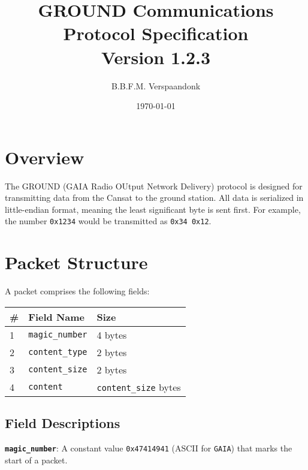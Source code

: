 \documentclass[a4paper]{article}
\title{GROUND Communications Protocol Specification\\ \large Version 1.2.3}
\date{\today}
\author{B.B.F.M. Verspaandonk}
\begin{document}
\maketitle

\tableofcontents

\section{Overview}
The GROUND (GAIA Radio OUtput Network Delivery) protocol is designed for transmitting data from the Cansat to the ground station. All data is serialized in little-endian format, meaning the least significant byte is sent first. For example, the number \texttt{0x1234} would be transmitted as \texttt{0x34 0x12}.

\section{Packet Structure}
A packet comprises the following fields:
\begin{longtable}{@{}lll@{}}
\toprule
\# & Field Name         & Size                \\
\midrule
1  & \texttt{magic\_number}      & 4 bytes             \\
2  & \texttt{content\_type} & 2 bytes             \\
3  & \texttt{content\_size} & 2 bytes             \\
4  & \texttt{content}     & \texttt{content\_size} bytes \\
\bottomrule
\end{longtable}

\subsection{Field Descriptions}
\textbf{\texttt{magic\_number}}: A constant value \texttt{0x47414941} (ASCII for \texttt{GAIA}) that marks the start of a packet.
\end{document}
